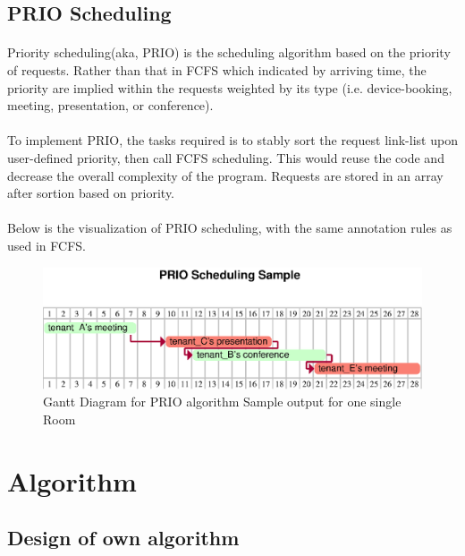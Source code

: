 \documentclass{article}
\begin{document}
        \subsection{PRIO Scheduling}
            \paragraph{}
            Priority scheduling(aka, PRIO) is the scheduling algorithm based on the
                priority of requests. Rather than that in FCFS which indicated by arriving time, the priority are implied within the requests weighted by its type (i.e. device-booking, meeting, presentation, or conference). 
            \paragraph{}
            To implement PRIO, the tasks required is to stably sort the request link-list upon user-defined priority, then call FCFS scheduling. This would reuse the code and decrease the overall complexity of the program.
                Requests are stored in an array after sortion based on priority. 
            \paragraph{}
            Below is the visualization of PRIO scheduling, with the same annotation rules as used in FCFS.
            \begin{figure}[!htbp]
                \centering
                \includegraphics[scale=0.7]{../res/eps/prio_scheduling.eps}
                \caption{Gantt Diagram for PRIO algorithm Sample output for one single Room}
            \end{figure}
    \cleardoublepage
    \section{Algorithm}
    \subsection{Design of own algorithm}
\end{document}
